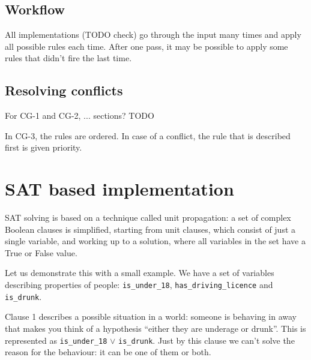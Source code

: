 \documentclass[a4paper, 11pt]{article}
\begin{document}
\subsection{Workflow}

All implementations (TODO check) go through the input many times and apply all possible rules each time. 
After one pass, it may be possible to apply some rules that didn't fire the last time.


\subsection{Resolving conflicts}

For CG-1 and CG-2, ... sections? TODO

In CG-3, the rules are ordered. In case of a conflict, the rule that is described first is given priority.


\section{SAT based implementation}

SAT solving is based on a technique called unit propagation:
a set of complex Boolean clauses is simplified, starting from unit
clauses, which consist of just a single variable, and working up to a solution, where all variables in the set
have a True or False value.

Let us demonstrate this with a small example.
We have a set of variables describing properties of people: \texttt{is\_under\_18},
\texttt{has\_driving\_licence} and \texttt{is\_drunk}.



Clause 1 describes a possible situation in a world: someone is behaving in away that makes you think of a hypothesis ``either they are underage or
drunk''. This is represented as \texttt{is\_under\_18} $\vee$
\texttt{is\_drunk}. Just by this clause we can't solve the reason for the
behaviour: it can be one of them or both.
\end{document}
